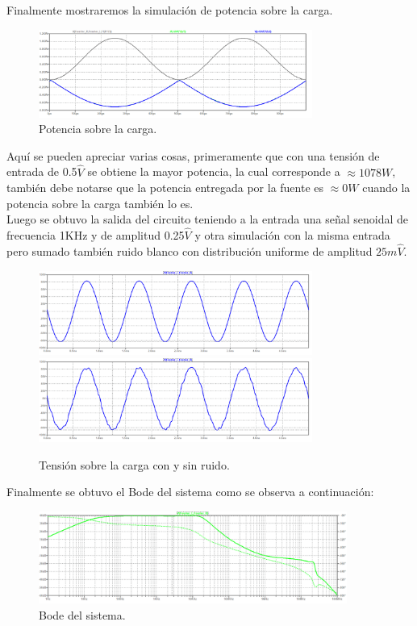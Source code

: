 Finalmente mostraremos la simulación de potencia sobre la carga.
\begin{figure}[H]
	\centering
	\includegraphics[width=0.8\textwidth]{ImagenesSimulaciones/PRL.png}
	\caption{Potencia sobre la carga.}
	\label{fig:porl}
\end{figure}
Aquí se pueden apreciar varias cosas, primeramente que con una tensión de entrada de 0.5$\hat{V}$ se obtiene la mayor potencia, la cual corresponde a $\approx 1078W$, también debe notarse que la potencia entregada por la fuente es $\approx 0W$ cuando la potencia sobre la carga también lo es.\\
Luego se obtuvo la salida del circuito teniendo a la entrada una señal senoidal de frecuencia 1KHz y de amplitud 0.25$\hat{V}$ y otra simulación con la misma entrada pero sumado también ruido blanco con distribución uniforme de amplitud $25m\hat{V}$.
\begin{figure}[H]
	\centering
	\includegraphics[width=0.8\textwidth]{ImagenesSimulaciones/VRL.png}
		\includegraphics[width=0.8\textwidth]{ImagenesSimulaciones/VRLNoise.png}
	\caption{Tensión sobre la carga con y sin ruido.}
	\label{fig:VRLN}
\end{figure}
Finalmente se obtuvo el Bode del sistema como se observa a continuación:
\begin{figure}[H]
	\centering
	\includegraphics[width=0.9\textwidth]{ImagenesSimulaciones/BODE.png}
	\caption{Bode del sistema.}
	\label{fig:bode}
\end{figure}
